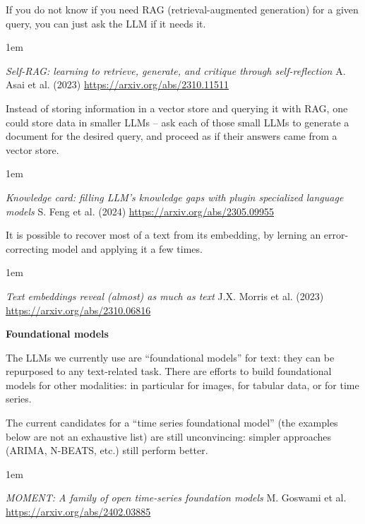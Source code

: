 \documentclass[a5paper]{article}
\newenvironment{reference}{%
  \medskip\goodbreak
  \parskip 0pt
  \raggedright
  \leftskip 1em
  \obeylines
}{\par\medskip\goodbreak}
\def\section#1{\clearpage{\vspace*{0cm}\LARGE\centering\bfseries #1\par\bigskip\bigskip}}
\def\subsection#1{{\par\bigskip\goodbreak\large\bfseries #1\par}}
\begin{document}
If you do not know if you need RAG (retrieval-augmented generation)
for a given query, you can just ask the LLM if it needs it.

\begin{reference}
  \emph{Self-RAG: learning to retrieve, generate, and critique through self-reflection}
  A. Asai et al. (2023)
  \url{https://arxiv.org/abs/2310.11511}
\end{reference}

Instead of storing information in a vector store and querying it with RAG,
one could store data in smaller LLMs -- ask each of those small LLMs
to generate a document for the desired query, and proceed as if their answers came from a vector store.

\begin{reference}
  \emph{Knowledge card: filling LLM's knowledge gaps with plugin specialized language models}
  S. Feng et al. (2024)
  \url{https://arxiv.org/abs/2305.09955}
\end{reference}

It is possible to recover most of a text from its embedding,
by lerning an error-correcting model and applying it a few times. 

\begin{reference}
  \emph{Text embeddings reveal (almost) as much as text}
  J.X. Morris et al. (2023)
  \url{https://arxiv.org/abs/2310.06816}
\end{reference}

\section{Time series}

\subsection{Foundational models}

The LLMs we currently use are ``foundational models'' for text:
they can be repurposed to any text-related task.
There are efforts to build foundational models for other modalities:
in particular for images, for tabular data, or for time series.

The current candidates for a ``time series foundational model''
(the examples below are not an exhaustive list)
are still unconvincing: simpler approaches (ARIMA, N-BEATS, etc.)
still perform better.

\begin{reference}
  \emph{MOMENT: A family of open time-series foundation models}
  M. Goswami et al.
  \url{https://arxiv.org/abs/2402.03885}
\end{reference}
\end{document}
